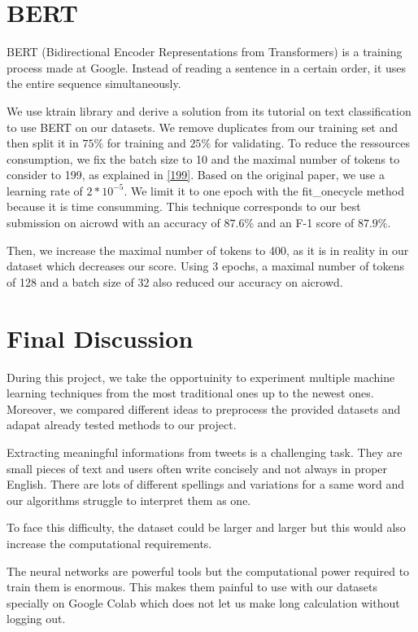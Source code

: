 \documentclass[11pt, a4paper, twocolumn]{article}
\begin{document}
\section{BERT}
BERT (Bidirectional Encoder Representations from Transformers)\cite{bertpaper} is a training process made at Google. Instead of reading a sentence in a certain order, it uses the entire sequence simultaneously.

We use ktrain library\cite{ktrain} and derive a solution from its tutorial on text classification to use BERT on our datasets. We remove duplicates from our training set and then split it in $75\%$ for training and $25\%$ for validating. To reduce the ressources consumption, we fix the batch size to 10 and the maximal number of tokens to consider to 199, as explained in \ref{199}. Based on the original paper, we use a learning rate of $2*10^{-5}$. We limit it to one epoch with the fit\_onecycle method because it is time consumming. This technique corresponds to our best submission on aicrowd with an accuracy of $87.6\%$ and an F-1 score of $87.9\%$.

Then, we  increase the maximal number of tokens to 400, as it is in reality in our dataset which decreases our score. Using 3 epochs, a maximal number of tokens of 128 and a batch size of 32 also reduced our accuracy on aicrowd.

\section{Final Discussion}
During this project, we take the opportuinity to experiment multiple machine learning techniques from the most traditional ones up to the newest ones. Moreover, we compared different ideas to preprocess the provided datasets and adapat already tested methods to our project.

Extracting meaningful informations from tweets is a challenging task. They are small pieces of text and users often write concisely and not always in proper English. There are lots of different spellings and variations for a same word and our algorithms struggle to interpret them as one.

To face this difficulty, the dataset could be larger and larger but this would also increase the computational requirements.

The neural networks are powerful tools but the computational power required to train them 
is enormous. This makes them painful to use with our datasets specially on Google Colab which does not let us make long calculation without logging out. 
\end{document}
